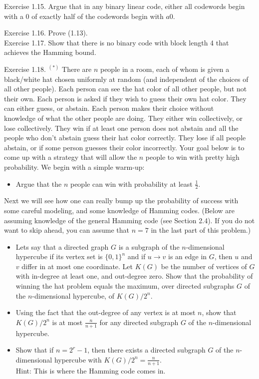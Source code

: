 \documentclass[10pt]{article}
\begin{document}
Exercise 1.15. Argue that in any binary linear code, either all codewords begin with a 0 of exactly half of the codewords begin with $a 0$.

Exercise 1.16. Prove (1.13).\\
Exercise 1.17. Show that there is no binary code with block length 4 that achieves the Hamming bound.

Exercise 1.18. ${ }^{(*)}$ There are $n$ people in a room, each of whom is given a black/white hat chosen uniformly at random (and independent of the choices of all other people). Each person can see the hat color of all other people, but not their own. Each person is asked if they wish to guess their own hat color. They can either guess, or abstain. Each person makes their choice without\\
knowledge of what the other people are doing. They either win collectively, or lose collectively. They win if at least one person does not abstain and all the people who don't abstain guess their hat color correctly. They lose if all people abstain, or if some person guesses their color incorrectly. Your goal below is to come up with a strategy that will allow the $n$ people to win with pretty high probability. We begin with a simple warm-up:

\begin{itemize}
  \item[1.] Argue that the $n$ people can win with probability at least $\frac{1}{2}$.
\end{itemize}

Next we will see how one can really bump up the probability of success with some careful modeling, and some knowledge of Hamming codes. (Below are assuming knowledge of the general Hamming code (see Section 2.4). If you do not want to skip ahead, you can assume that $n=7$ in the last part of this problem.)

\begin{itemize}
  \item[2.] Lets say that a directed graph $G$ is a subgraph of the $n$-dimensional hypercube if its vertex set is $\{0,1\}^{n}$ and if $u \rightarrow v$ is an edge in $G$, then $u$ and $v$ differ in at most one coordinate. Let $K(G)$ be the number of vertices of $G$ with in-degree at least one, and out-degree zero. Show that the probability of winning the hat problem equals the maximum, over directed subgraphs $G$ of the $n$-dimensional hypercube, of $K(G) / 2^{n}$.
  \item[3.] Using the fact that the out-degree of any vertex is at most $n$, show that $K(G) / 2^{n}$ is at most $\frac{n}{n+1}$ for any directed subgraph $G$ of the $n$-dimensional hypercube.
  \item[4.] Show that if $n=2^{r}-1$, then there exists a directed subgraph $G$ of the $n$-dimensional hypercube with $K(G) / 2^{n}=\frac{n}{n+1}$.\\
Hint: This is where the Hamming code comes in.
\end{itemize}
\end{document}
